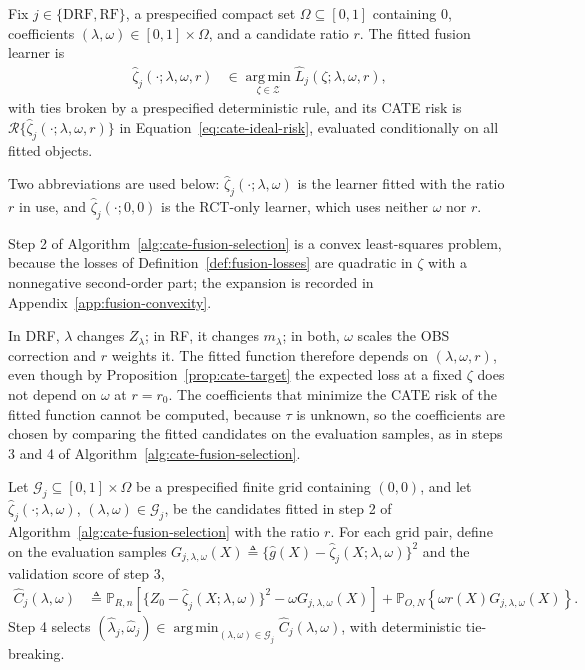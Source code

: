 \begin{definition}
\label{def:fitted-fusion-learner}
Fix $j\in\{\mathrm{DRF},\mathrm{RF}\}$, a prespecified compact set $\Omega\subseteq[0,1]$ containing $0$, coefficients $(\lambda,\omega)\in[0,1]\times\Omega$, and a candidate ratio $r$. The fitted fusion learner is
\begin{align}
\widehat\zeta_j(\cdot;\lambda,\omega,r)
&\in\operatorname*{arg\,min}_{\zeta\in\mathcal Z}\widehat L_j(\zeta;\lambda,\omega,r),
\label{eq:fitted-fusion-learner}
\end{align}
with ties broken by a prespecified deterministic rule, and its CATE risk is $\mathcal R\{\widehat\zeta_j(\cdot;\lambda,\omega,r)\}$ in Equation~\eqref{eq:cate-ideal-risk}, evaluated conditionally on all fitted objects.
\end{definition}
Two abbreviations are used below: $\widehat\zeta_j(\cdot;\lambda,\omega)$ is the learner fitted with the ratio $r$ in use, and $\widehat\zeta_j(\cdot;0,0)$ is the RCT-only learner, which uses neither $\omega$ nor $r$.

Step 2 of Algorithm~\ref{alg:cate-fusion-selection} is a convex least-squares problem, because the losses of Definition~\ref{def:fusion-losses} are quadratic in $\zeta$ with a nonnegative second-order part; the expansion is recorded in Appendix~\ref{app:fusion-convexity}.

In DRF, $\lambda$ changes $Z_\lambda$; in RF, it changes $m_\lambda$; in both, $\omega$ scales the OBS correction and $r$ weights it. The fitted function therefore depends on $(\lambda,\omega,r)$, even though by Proposition~\ref{prop:cate-target} the expected loss at a fixed $\zeta$ does not depend on $\omega$ at $r=r_0$.
The coefficients that minimize the CATE risk of the fitted function cannot be computed, because $\tau$ is unknown, so the coefficients are chosen by comparing the fitted candidates on the evaluation samples, as in steps 3 and 4 of Algorithm~\ref{alg:cate-fusion-selection}.

\begin{definition}
\label{def:cate-finite-grid-validation}
Let $\mathcal G_j\subseteq[0,1]\times\Omega$ be a prespecified finite grid containing $(0,0)$, and let $\widehat\zeta_j(\cdot;\lambda,\omega)$, $(\lambda,\omega)\in\mathcal G_j$, be the candidates fitted in step 2 of Algorithm~\ref{alg:cate-fusion-selection} with the ratio $r$. For each grid pair, define on the evaluation samples $G_{j,\lambda,\omega}(X)\triangleq\{\widehat g(X)-\widehat\zeta_j(X;\lambda,\omega)\}^2$ and the validation score of step 3,
\begin{align}
\widehat C_j(\lambda,\omega)
&\triangleq\mathbb P_{R,n}\left[\{Z_0-\widehat\zeta_j(X;\lambda,\omega)\}^2-\omega G_{j,\lambda,\omega}(X)\right]+\mathbb P_{O,N}\left\{\omega r(X)G_{j,\lambda,\omega}(X)\right\}.
\label{eq:common-reference-validation}
\end{align}
Step 4 selects $(\widehat\lambda_j,\widehat\omega_j)\in\operatorname*{arg\,min}_{(\lambda,\omega)\in\mathcal G_j}\widehat C_j(\lambda,\omega)$, with deterministic tie-breaking.
\end{definition}

